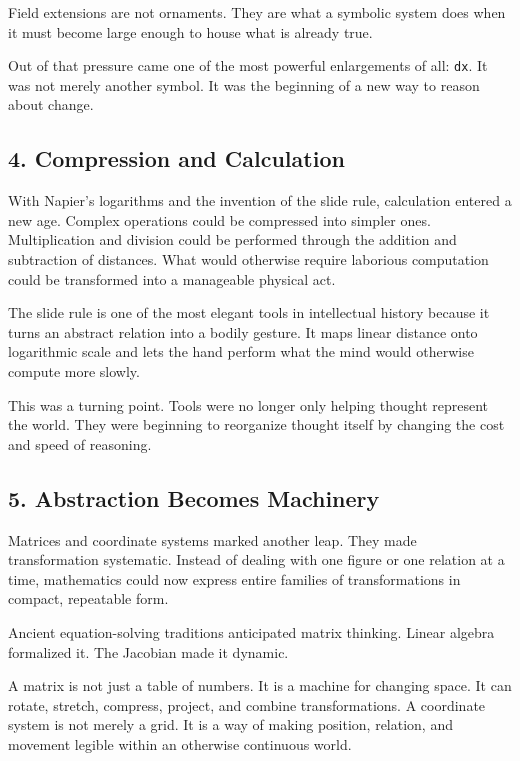 Field extensions are not ornaments. They are what a symbolic system does
when it must become large enough to house what is already true.

Out of that pressure came one of the most powerful enlargements of all:
\texttt{dx}. It was not merely another symbol. It was the beginning of a
new way to reason about change.

\hypertarget{compression-and-calculation}{%
\subsection{4. Compression and
Calculation}\label{compression-and-calculation}}

With Napier's logarithms and the invention of the slide rule,
calculation entered a new age. Complex operations could be compressed
into simpler ones. Multiplication and division could be performed
through the addition and subtraction of distances. What would otherwise
require laborious computation could be transformed into a manageable
physical act.

The slide rule is one of the most elegant tools in intellectual history
because it turns an abstract relation into a bodily gesture. It maps
linear distance onto logarithmic scale and lets the hand perform what
the mind would otherwise compute more slowly.

This was a turning point. Tools were no longer only helping thought
represent the world. They were beginning to reorganize thought itself by
changing the cost and speed of reasoning.

\hypertarget{abstraction-becomes-machinery}{%
\subsection{5. Abstraction Becomes
Machinery}\label{abstraction-becomes-machinery}}

Matrices and coordinate systems marked another leap. They made
transformation systematic. Instead of dealing with one figure or one
relation at a time, mathematics could now express entire families of
transformations in compact, repeatable form.

Ancient equation-solving traditions anticipated matrix thinking. Linear
algebra formalized it. The Jacobian made it dynamic.

A matrix is not just a table of numbers. It is a machine for changing
space. It can rotate, stretch, compress, project, and combine
transformations. A coordinate system is not merely a grid. It is a way
of making position, relation, and movement legible within an otherwise
continuous world.

